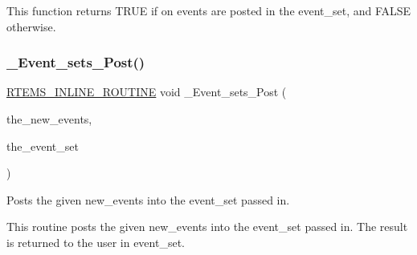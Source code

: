 This function returns T\+R\+UE if on events are posted in the event\+\_\+set, and F\+A\+L\+SE otherwise. \mbox{\label{group__ClassicEventImpl_ga7f13b2e266b6f66390fcdf588ae80262}} 
\subsubsection{\texorpdfstring{\_Event\_sets\_Post()}{\_Event\_sets\_Post()}}
{\footnotesize\ttfamily \mbox{\hyperlink{group__RTEMSScoreBaseDefs_gac216239df231d5dbd15e3520b0b9313f}{R\+T\+E\+M\+S\+\_\+\+I\+N\+L\+I\+N\+E\+\_\+\+R\+O\+U\+T\+I\+NE}} void \+\_\+\+Event\+\_\+sets\+\_\+\+Post (\begin{DoxyParamCaption}\item[{\mbox{\hyperlink{group__ClassicEventSet_gab7b8f373bea85fd4e3b7ae23905faa07}{rtems\+\_\+event\+\_\+set}}}]{the\+\_\+new\+\_\+events,  }\item[{\mbox{\hyperlink{group__ClassicEventSet_gab7b8f373bea85fd4e3b7ae23905faa07}{rtems\+\_\+event\+\_\+set}} $\ast$}]{the\+\_\+event\+\_\+set }\end{DoxyParamCaption})}



Posts the given new\+\_\+events into the event\+\_\+set passed in. 

This routine posts the given new\+\_\+events into the event\+\_\+set passed in. The result is returned to the user in event\+\_\+set. 